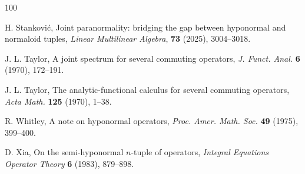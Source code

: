 \documentclass[10pt, a4paper, oneside, reqno]{amsproc}
\numberwithin{equation}{section}
\theoremstyle{remark}
\theoremstyle{definition}
\begin{document}
\begin{thebibliography}{100}
	
 H. Stanković, Joint paranormality: bridging the gap between hyponormal and normaloid tuples, 
{\it Linear Multilinear Algebra}, {\bf 73} (2025), 3004--3018.


 J. L. Taylor, A joint spectrum for several commuting operators, {\it J. Funct. Anal.} {\bf 6} (1970),
172--191.

 J. L. Taylor,
The analytic-functional calculus for several commuting operators, {\it Acta Math.} {\bf 125} (1970), 1--38.

 R. Whitley, 
A note on hyponormal operators,
{\it Proc. Amer. Math. Soc.} {\bf 49} (1975), 399--400. 

 D. Xia, On the semi-hyponormal $n$-tuple of operators, {\it Integral Equations Operator Theory} {\bf 6} (1983), 879--898.

\end{thebibliography}
\end{document}
